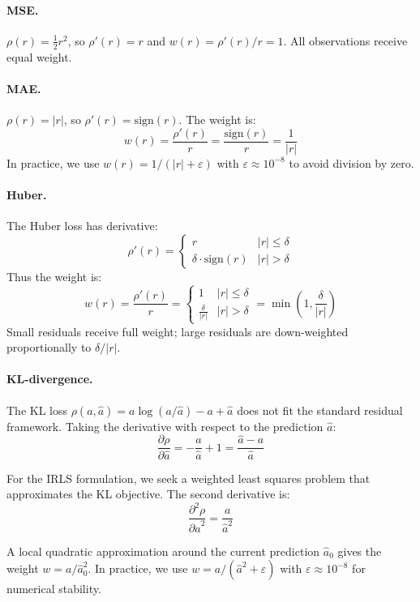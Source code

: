 \documentclass[article]{jss_modified}
\begin{document}
\begin{appendix}
\paragraph{MSE.} 
$\rho(r) = \frac{1}{2}r^2$, so $\rho'(r) = r$ and $w(r) = \rho'(r)/r = 1$. 
All observations receive equal weight.

\paragraph{MAE.} 
$\rho(r) = |r|$, so $\rho'(r) = \text{sign}(r)$. The weight is:
\[
w(r) = \frac{\rho'(r)}{r} = \frac{\text{sign}(r)}{r} = \frac{1}{|r|}
\]
In practice, we use $w(r) = 1/(|r| + \varepsilon)$ with $\varepsilon \approx 
10^{-8}$ to avoid division by zero.

\paragraph{Huber.} 
The Huber loss has derivative:
\[
\rho'(r) = \begin{cases} r & |r| \leq \delta \\ \delta \cdot \text{sign}(r) & 
|r| > \delta \end{cases}
\]
Thus the weight is:
\[
w(r) = \frac{\rho'(r)}{r} = \begin{cases} 1 & |r| \leq \delta \\ 
\frac{\delta}{|r|} & |r| > \delta \end{cases} = \min\left(1, 
\frac{\delta}{|r|}\right)
\]
Small residuals receive full weight; large residuals are down-weighted 
proportionally to $\delta/|r|$.

\paragraph{KL-divergence.} 
The KL loss $\rho(a, \hat{a}) = a\log(a/\hat{a}) - a + \hat{a}$ does not fit 
the standard residual framework. Taking the derivative with respect to the 
prediction $\hat{a}$:
\[
\frac{\partial\rho}{\partial\hat{a}} = -\frac{a}{\hat{a}} + 1 = 
\frac{\hat{a} - a}{\hat{a}}
\]

For the IRLS formulation, we seek a weighted least squares problem that 
approximates the KL objective. The second derivative is:
\[
\frac{\partial^2\rho}{\partial\hat{a}^2} = \frac{a}{\hat{a}^2}
\]

A local quadratic approximation around the current prediction $\hat{a}_0$ gives 
the weight $w = a/\hat{a}_0^2$. In practice, we use 
$w = a/(\hat{a}^2 + \varepsilon)$ with $\varepsilon \approx 10^{-8}$ for 
numerical stability.

\end{appendix}
\end{document}
